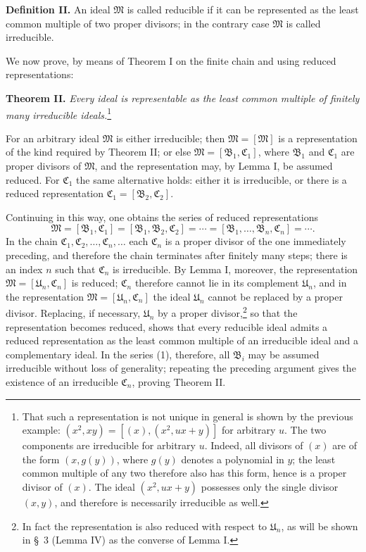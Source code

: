 \documentclass[11pt]{article}
\newcommand{\ideal}[1]{\mathfrak{#1}}
\begin{document}
\textbf{Definition II.} An ideal $\ideal M$ is called reducible if it can be represented as the least common multiple of two proper divisors; in the contrary case $\ideal M$ is called irreducible.

We now prove, by means of Theorem I on the finite chain and using reduced representations:

\textbf{Theorem II.} \emph{Every ideal is representable as the least common multiple of finitely many irreducible ideals.}\footnote{That such a representation is not unique in general is shown by the previous example: $(x^2,xy)=[(x),(x^2,ux+y)]$ for arbitrary $u$. The two components are irreducible for arbitrary $u$. Indeed, all divisors of $(x)$ are of the form $(x,g(y))$, where $g(y)$ denotes a polynomial in $y$; the least common multiple of any two therefore also has this form, hence is a proper divisor of $(x)$. The ideal $(x^2,ux+y)$ possesses only the single divisor $(x,y)$, and therefore is necessarily irreducible as well.}

For an arbitrary ideal $\ideal M$ is either irreducible; then $\ideal M=[\ideal M]$ is a representation of the kind required by Theorem II; or else $\ideal M=[\ideal B_1,\ideal C_1]$, where $\ideal B_1$ and $\ideal C_1$ are proper divisors of $\ideal M$, and the representation may, by Lemma I, be assumed reduced. For $\ideal C_1$ the same alternative holds: either it is irreducible, or there is a reduced representation $\ideal C_1=[\ideal B_2,\ideal C_2]$.

Continuing in this way, one obtains the series of reduced representations
\begin{equation}
 \ideal M=[\ideal B_1,\ideal C_1]=[\ideal B_1,\ideal B_2,\ideal C_2]=\cdots=[\ideal B_1,\ldots,\ideal B_n,\ideal C_n]=\cdots .
\tag{1}
\end{equation}
In the chain $\ideal C_1,\ideal C_2,\ldots,\ideal C_n,\ldots$ each $\ideal C_n$ is a proper divisor of the one immediately preceding, and therefore the chain terminates after finitely many steps; there is an index $n$ such that $\ideal C_n$ is irreducible. By Lemma I, moreover, the representation $\ideal M=[\ideal U_n,\ideal C_n]$ is reduced; $\ideal C_n$ therefore cannot lie in its complement $\ideal U_n$, and in the representation $\ideal M=[\ideal U_n,\ideal C_n]$ the ideal $\ideal U_n$ cannot be replaced by a proper divisor. Replacing, if necessary, $\ideal U_n$ by a proper divisor,\footnote{In fact the representation is also reduced with respect to $\ideal U_n$, as will be shown in \S~3 (Lemma IV) as the converse of Lemma I.} so that the representation becomes reduced, shows that every reducible ideal admits a reduced representation as the least common multiple of an irreducible ideal and a complementary ideal. In the series (1), therefore, all $\ideal B_i$ may be assumed irreducible without loss of generality; repeating the preceding argument gives the existence of an irreducible $\ideal C_n$, proving Theorem II.
\end{document}
